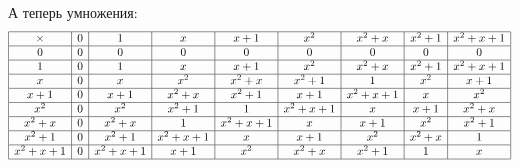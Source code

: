\documentclass[a4paper, 10pt]{article}
\begin{document}
\begin{spacing}{1}
А теперь умножения:
$$
\begin{array}{|c|c|c|c|c|c|c|c|c|}
\hline
\times		& 0 & 1 & x & x + 1 & x^2 & x^2 + x & x^2 + 1 &  x^2 + x + 1\\
\hline
0			& 0 & 0 & 0 & 0 & 0 & 0 & 0 &  0\\
\hline
1			& 0 & 1 & x & x + 1 & x^2 & x^2 + x & x^2 + 1 &  x^2 + x + 1\\
\hline
x			& 0 & x & x^2 & x^2 + x & x^2 + 1 & 1 & x^2 &  x + 1\\
\hline
x + 1		& 0 & x + 1 & x^2 + x & x^2 + 1 & x + 1 & x^2 + x + 1 & x &  x^2\\
\hline
x^2			& 0 & x^2 & x^2 + 1 & 1 & x^2 + x + 1 & x & x + 1 &  x^2 + x\\
\hline
x^2 + x		& 0 & x^2 + x & 1 & x^2+x+1 & x & x + 1 & x^2 &  x^2 + 1\\
\hline
x^2 + 1		& 0 & x^2 + 1 & x^2 + x + 1 & x & x + 1 & x^2 & x^2 + x & 1\\
\hline
x^2 + x + 1	& 0 & x^2 + x + 1 & x + 1 & x^2 & x^2 + x & x^2 + 1 & 1 & x\\
\hline
\end{array}
$$
		
\begin{center}
\end{center}
		

\end{spacing}
\end{document}
